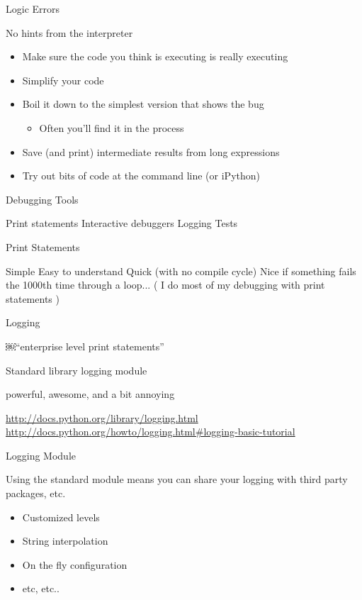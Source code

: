 \documentclass{beamer}
\begin{document}
\begin{frame}[fragile]{Logic Errors}

{\LARGE No hints from the interpreter}

\vfill
\begin{itemize}
  \item Make sure the code you think is executing is really executing
  \item Simplify your code
  \item Boil it down to the simplest version that shows the bug
  \begin{itemize}
    \item Often you'll find it in the process
  \end{itemize}
  \item Save (and print) intermediate results from long expressions
  \item Try out bits of code at the command line (or iPython)
\end{itemize}

\end{frame} 

\begin{frame}[fragile]{Debugging Tools}

{\LARGE
\vfill
Print statements
\vfill
Interactive debuggers
\vfill
Logging
\vfill
Tests
}
\end{frame} 

\begin{frame}[fragile]{Print Statements}

{\LARGE
\vfill
Simple
\vfill
Easy to understand
\vfill
Quick (with no compile cycle)
\vfill
Nice if something fails the 1000th time through a loop...
}
\vfill
( I do most of my debugging with print statements )
\end{frame} 

\begin{frame}[fragile]{Logging}

{\LARGE ￼``enterprise level print statements''}

\vfill
Standard library logging module

\vfill
powerful, awesome, and a bit annoying

\vfill
\url{http://docs.python.org/library/logging.html}
\url{http://docs.python.org/howto/logging.html#logging-basic-tutorial}

\end{frame} 

\begin{frame}[fragile]{Logging Module}

{\LARGE Using the standard module means you can share your logging with third
party packages, etc.}

\vfill
\begin{itemize}
  \item Customized levels
  \item String interpolation
  \item On the fly configuration
  \item etc, etc..
\end{itemize}

\end{frame} 
\end{document}

